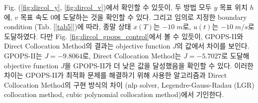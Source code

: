 Fig. (\ref{fig:dircol_y}, \ref{fig:dircol_v})에서 확인할 수 있듯이, 두 방법 모두 $y$ 목표 위치 $h$에, $v$ 목표 속도 $0$에 도달하는 것을 확인할 수 있다.
그리고 임의로 지정한 boundary condition (Tab. [\ref{tab5}])에 따라, 종말 상태 $x(T)$는 $-10\;m$로, $u(t)$는 $-10\;m/s$로 도달하였다.
다만 Fig. \ref{fig:dircol_gpops_control}에서 볼 수 있듯이, GPOPS-II와 Direct Collocation Method의 결과는 objective function $J$의 값에서 차이를 보인다.
GPOPS-II는 $J = -9.8064$로, Direct Collocation Method는 $J = -5.7027$로 도달해 objective function $J$을 GPOPS-II가 더 낮은 값을 달성했음을 확인할 수 있다.
이러한 차이는 GPOPS-II가 최적화 문제를 해결하기 위해 사용한 알고리즘과 Direct Collocation Method의 구현 방식의 차이 (nlp solver, Legendre-Gauss-Radau (LGR) collocation method, cubic polynomial collocation method)에서 기인한다.




